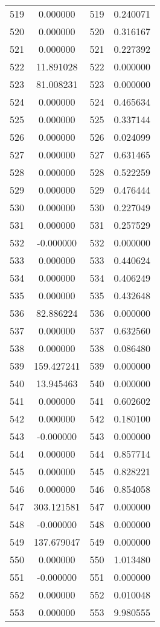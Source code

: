 \documentclass[12pt]{article}
\begin{document}
\begin{longtable}{@{}cccc@{}}
519 & 0.000000 & 519 & 0.240071 \\
520 & 0.000000 & 520 & 0.316167 \\
521 & 0.000000 & 521 & 0.227392 \\
522 & 11.891028 & 522 & 0.000000 \\
523 & 81.008231 & 523 & 0.000000 \\
524 & 0.000000 & 524 & 0.465634 \\
525 & 0.000000 & 525 & 0.337144 \\
526 & 0.000000 & 526 & 0.024099 \\
527 & 0.000000 & 527 & 0.631465 \\
528 & 0.000000 & 528 & 0.522259 \\
529 & 0.000000 & 529 & 0.476444 \\
530 & 0.000000 & 530 & 0.227049 \\
531 & 0.000000 & 531 & 0.257529 \\
532 & -0.000000 & 532 & 0.000000 \\
533 & 0.000000 & 533 & 0.440624 \\
534 & 0.000000 & 534 & 0.406249 \\
535 & 0.000000 & 535 & 0.432648 \\
536 & 82.886224 & 536 & 0.000000 \\
537 & 0.000000 & 537 & 0.632560 \\
538 & 0.000000 & 538 & 0.086480 \\
539 & 159.427241 & 539 & 0.000000 \\
540 & 13.945463 & 540 & 0.000000 \\
541 & 0.000000 & 541 & 0.602602 \\
542 & 0.000000 & 542 & 0.180100 \\
543 & -0.000000 & 543 & 0.000000 \\
544 & 0.000000 & 544 & 0.857714 \\
545 & 0.000000 & 545 & 0.828221 \\
546 & 0.000000 & 546 & 0.854058 \\
547 & 303.121581 & 547 & 0.000000 \\
548 & -0.000000 & 548 & 0.000000 \\
549 & 137.679047 & 549 & 0.000000 \\
550 & 0.000000 & 550 & 1.013480 \\
551 & -0.000000 & 551 & 0.000000 \\
552 & 0.000000 & 552 & 0.010048 \\
553 & 0.000000 & 553 & 9.980555 \\

\end{longtable}
\end{document}
